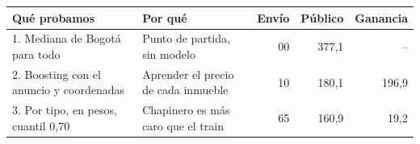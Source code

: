 \begin{tabular}{llrrr}
\toprule
Qué probamos & Por qué & Envío & Público & Ganancia \\
\midrule
1. Mediana de Bogotá para todo & Punto de partida, sin modelo & 00 & 377,1 & -- \\
2. Boosting con el anuncio y coordenadas & Aprender el precio de cada inmueble & 10 & 180,1 & 196,9 \\
3. Por tipo, en pesos, cuantil 0,70 & Chapinero es más caro que el train & 65 & 160,9 & 19,2 \\
\bottomrule
\end{tabular}
